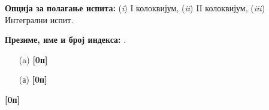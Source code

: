 \documentclass[10pt, a4paper, twoside]{article}
\begin{document}
\noindent
\textbf{Опција за полагање испита:} 
\hfill
(\textit{i}) I колоквијум, 
\hfill
(\textit{ii}) II колоквијум,
\hfill
(\textit{iii}) Интегрални испит.

\vspace*{5mm}

\noindent
\textbf{Презиме, име и број индекса:}
\hrulefill.

\vspace*{5mm}
\noindent
{}
\begin{minipage}[t]{0.93\textwidth}
\begin{enumerate}
\itemsep0pt
\item[(a)] \textbf{[0п]}
\end{enumerate}
\end{minipage}

\vspace*{1mm}

\newpage


\noindent
{}
\begin{minipage}[t]{0.93\textwidth}
\begin{enumerate}
\itemsep0pt
\item[(а)] \textbf{[0п]}
\end{enumerate}
\end{minipage}



\newpage


\noindent
\begin{minipage}[t]{0.8\linewidth}
\noindent
{} 
\vspace*{2mm}
\end{minipage}
\begin{minipage}[t]{0.2\linewidth}
\begin{flushright}
	\vspace{-10pt}
\end{flushright}
\end{minipage}

\vspace*{5mm}
\noindent


\newpage 

\noindent
\begin{minipage}[t]{0.7\linewidth}
\noindent
{} \textbf{[0п]} 
\end{minipage}
\begin{minipage}[t]{0.3\linewidth}
\begin{flushright}
	\vspace{-10pt}
\end{flushright}
\end{minipage}
\end{document}
